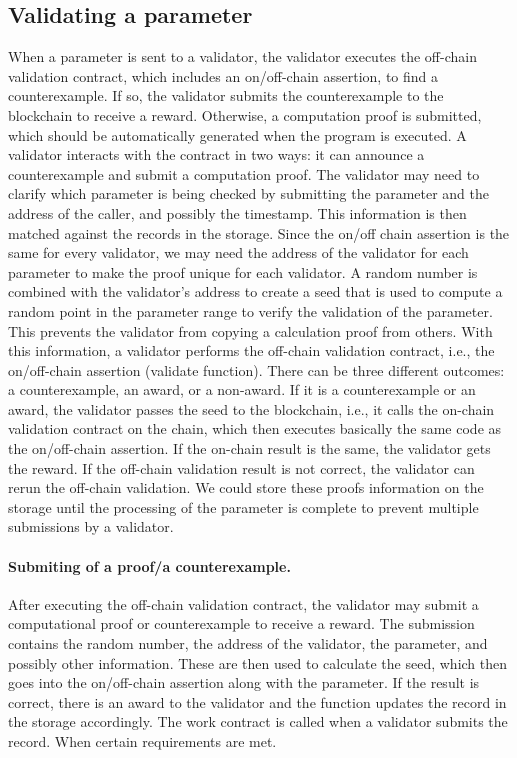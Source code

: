 \documentclass[runningheads]{llncs}
\begin{document}
\subsection{Validating a parameter}
When a parameter is sent to a validator, the validator executes the off-chain validation contract, which includes an on/off-chain assertion, to find a counterexample. If so, the validator submits the counterexample to the blockchain to receive a reward. Otherwise, a computation proof is submitted, which should be automatically generated when the program is executed. A validator interacts with the contract in two ways: it can announce a counterexample and submit a computation proof. The validator may need to clarify which parameter is being checked by submitting the parameter and the address of the caller, and possibly the timestamp. This information is then matched against the records in the storage. Since the on/off chain assertion is the same for every validator, we may need the address of the validator for each parameter to make the proof unique for each validator. A random number is combined with the validator's address to create a seed that is used to compute a random point in the parameter range to verify the validation of the parameter. This prevents the validator from copying a calculation proof from others. With this information, a validator performs the off-chain validation contract, i.e., the on/off-chain assertion (validate function). There can be three different outcomes: a counterexample, an award, or a non-award. If it is a counterexample or an award, the validator passes the seed to the blockchain, i.e., it calls the on-chain validation contract on the chain, which then executes basically the same code as the on/off-chain assertion. If the on-chain result is the same, the validator gets the reward. If the off-chain validation result is not correct, the validator can rerun the off-chain validation. We could store these proofs information on the storage until the processing of the parameter is complete to prevent multiple submissions by a validator. 

\paragraph{Submiting of a proof/a counterexample.} After executing the off-chain validation contract, the validator may submit a computational proof or counterexample to receive a reward. The submission contains the random number, the address of the validator, the parameter, and possibly other information. These are then used to calculate the seed, which then goes into the on/off-chain assertion along with the parameter. If the result is correct, there is an award to the validator and the function updates the record in the storage accordingly. The work contract is called when a validator submits the record. When  certain requirements are met.
\end{document}
